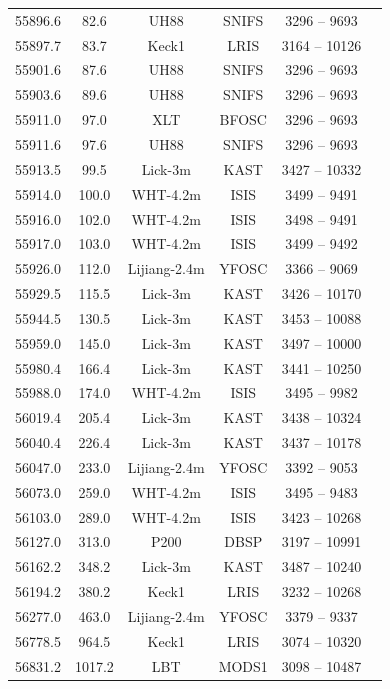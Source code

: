 \documentclass[a4paper,oneside,12pt, class=Latex/Classes/PhDthesisPSnPDF, crop=false]{standalone}
\begin{document}
\begin{longtable}{cccccc}
 55896.6 & 82.6 & UH88   & SNIFS & 3296 -- 9693 & \citet{spec_UH88} \\
 55897.7 & 83.7 & Keck1  & LRIS & 3164 -- 10126 & \citet{spec_Lick-3m} \\
 55901.6 & 87.6 & UH88   & SNIFS & 3296 -- 9693 & \citet{spec_UH88} \\
 55903.6 & 89.6 & UH88   & SNIFS & 3296 -- 9693 & \citet{spec_UH88} \\
 55911.0 & 97.0 & XLT   & BFOSC & 3296 -- 9693 & \citet{spec_Lijiang-2.4m} \\
 55911.6 & 97.6 & UH88   & SNIFS & 3296 -- 9693 & \citet{spec_UH88} \\
 55913.5 & 99.5 & Lick-3m  & KAST & 3427 -- 10332 & \citet{spec_Lick-3m} \\
 55914.0 & 100.0 & WHT-4.2m  & ISIS & 3499 -- 9491 & \citet{WHT_spec_100d} \\
 55916.0 & 102.0 & WHT-4.2m  & ISIS & 3498 -- 9491 & \citet{PTF_1, PTF_2} \\
 55917.0 & 103.0 & WHT-4.2m  & ISIS & 3499 -- 9492 & \citet{PTF_1, PTF_2} \\
 55926.0 & 112.0 & Lijiang-2.4m & YFOSC & 3366 -- 9069 & \citet{spec_Lijiang-2.4m} \\
 55929.5 & 115.5 & Lick-3m  & KAST & 3426 -- 10170 & \citet{spec_Lick-3m} \\
 55944.5 & 130.5 & Lick-3m  & KAST & 3453 -- 10088 & \citet{spec_Lick-3m} \\
 55959.0 & 145.0 & Lick-3m  & KAST & 3497 -- 10000 & \citet{PTF_1, PTF_2} \\
 55980.4 & 166.4 & Lick-3m  & KAST & 3441 -- 10250 & \citet{spec_Lick-3m} \\
 55988.0 & 174.0 & WHT-4.2m  & ISIS & 3495 -- 9982 & \citet{spec_WHT-4.2m} \\
 56019.4 & 205.4 & Lick-3m  & KAST & 3438 -- 10324 & \citet{spec_WHT-4.2m} \\
 56040.4 & 226.4 & Lick-3m  & KAST & 3437 -- 10178 & \citet{spec_WHT-4.2m} \\
 56047.0 & 233.0 & Lijiang-2.4m & YFOSC & 3392 -- 9053 & \citet{spec_Lijiang-2.4m} \\
 56073.0 & 259.0 & WHT-4.2m  & ISIS & 3495 -- 9483 & \citet{spec_WHT-4.2m} \\
 56103.0 & 289.0 & WHT-4.2m  & ISIS & 3423 -- 10268 & \citet{spec_WHT-4.2m} \\
 56127.0 & 313.0 & P200   & DBSP & 3197 -- 10991 & \citet{PTF_1, PTF_2} \\
 56162.2 & 348.2 & Lick-3m  & KAST & 3487 -- 10240 & \citet{spec_WHT-4.2m} \\
 56194.2 & 380.2 & Keck1  & LRIS & 3232 -- 10268 & \citet{spec_Lick-3m} \\
 56277.0 & 463.0 & Lijiang-2.4m & YFOSC & 3379 -- 9337 & \citet{spec_Lijiang-2.4m} \\
 56778.5 & 964.5 & Keck1  & LRIS & 3074 -- 10320 & \citet{spec_Lick-3m+Keck1} \\
 56831.2 & 1017.2& LBT   & MODS1 & 3098 -- 10487 & \citet{spec_LBT} \\
\end{longtable}
\normalsize
\end{document}

